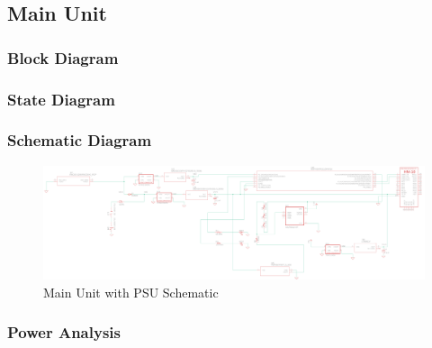 \subsection{Main Unit}
\subsubsection{Block Diagram}
\subsubsection{State Diagram}

\subsubsection{Schematic Diagram}
\begin{landscape}
  \begin{center}
  \begin{figure}[H]
    \includegraphics[width=\pdfpagewidth,height=0.65\textheight]{../Modular Design/Main-Unit/Figures/main-unit-and-psu.png}
    \caption{Main Unit with PSU Schematic}
    \label{fig:main-with-psu-schematic}
  \end{figure}
  \end{center}
  \end{landscape}
\subsubsection{Power Analysis}

